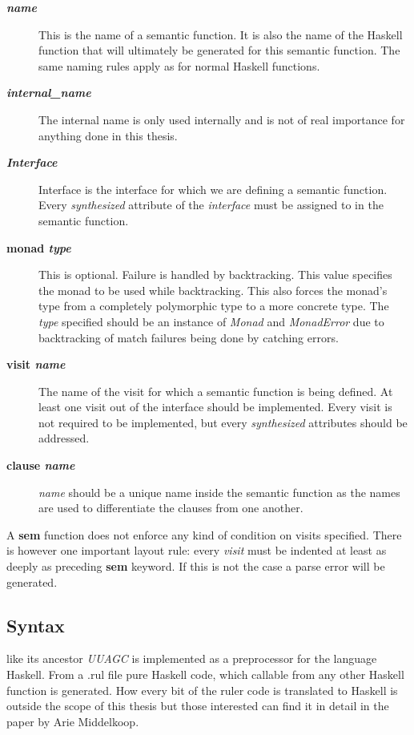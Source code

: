 \begin{description}
\item[\textbf{\textit{name}}] This is the name of a semantic function. It is also the name of the Haskell function that will ultimately be generated for this semantic function. The same naming rules apply as for normal Haskell functions.
\item[\textbf{\textit{internal\_name}}] The internal name is only used internally and is not of real importance for anything done in this thesis.
\item[\textbf{\textit{Interface}}] Interface is the interface for which we are defining a semantic function. Every \emph{synthesized} attribute of the \emph{interface} must be assigned to in the semantic function.
\item[\textbf{monad \textit{type}}] { This is optional. Failure is handled by backtracking. This value specifies the monad to be used while backtracking. This also forces the monad's type from a completely polymorphic type to a more concrete type. The \textit{type} specified should be an instance of \emph{Monad} and \emph{MonadError} due to backtracking of match failures being done by catching errors.}
\item[\textbf{visit \textit{name}}] The name of the visit for which a semantic function is being defined. At least one visit out of the interface should be implemented. Every visit is not required to be implemented, but every \emph{synthesized} attributes should be addressed.
\item[\textbf{clause \textit{name}}] \textit{name} should be a unique name inside the semantic function as the names are used to differentiate the clauses from one another.
\end{description}

A \textbf{sem} function does not enforce any kind of condition on visits specified. There is however one important layout rule: every \emph{visit} must be indented at least as deeply as preceding \textbf{sem} keyword. If this is not the case a parse error will be generated.

\subsection{Syntax}
\Rcore like its ancestor \emph{UUAGC} is implemented as a preprocessor for the language Haskell. From a .rul file pure Haskell code, which callable from any other Haskell function is generated. How every bit of the ruler code is translated to Haskell is outside the scope of this thesis but those interested can find it in detail in the paper by Arie Middelkoop\cite{visitag}.

